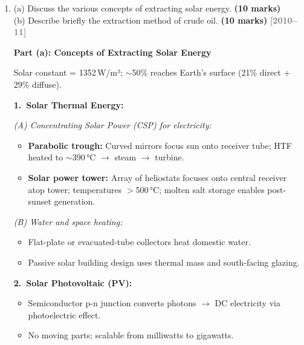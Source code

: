 \documentclass[12pt,a3paper]{article}
\newcommand{\yr}[1]{\hfill\textcolor{gray}{\small\textbf{[#1]}}}
\newcommand{\mk}[1]{\textcolor{orange!70!black}{\small\textbf{(#1 marks)}}}
\begin{document}
\begin{enumerate}
\begin{tcolorbox}[enhanced,breakable,ansbox,colback=cA!4,colframe=cA,
  boxrule=0.8pt,arc=5pt,
  title={\textbf{Answer}},fonttitle=\bfseries\color{white},colbacktitle=cA]
\[
  \underbrace{\text{CO}_2 + \text{H}_2\text{O} \xrightarrow{\text{sunlight}} \text{Biomass} + \text{O}_2}_{\text{photosynthesis (growth)}}
  \qquad
  \underbrace{\text{Biomass} + \text{O}_2 \to \text{CO}_2 + \text{H}_2\text{O} + \text{Heat}}_{\text{combustion (energy release)}}
\]

The cycle is closed — unlike fossil fuels where carbon was locked away for millions of years.

\end{tcolorbox}

\item \label{qlabel:A1-Q10}
(a) Discuss the various concepts of extracting solar energy. \mk{10}\\
(b) Describe briefly the extraction method of crude oil. \mk{10}
\yr{2010--11}

\begin{tcolorbox}[enhanced,breakable,ansbox,colback=cA!4,colframe=cA,
  boxrule=0.8pt,arc=5pt,
  title={\textbf{Answer}},fonttitle=\bfseries\color{white},colbacktitle=cA]

\textbf{Part (a): Concepts of Extracting Solar Energy}

Solar constant = 1352\,W/m²; $\sim$50\% reaches Earth's surface (21\% direct + 29\% diffuse).

\textbf{1.\ Solar Thermal Energy:}

\textit{(A) Concentrating Solar Power (CSP) for electricity:}
\begin{itemize}[leftmargin=1.5em,itemsep=1pt]
  \item \textbf{Parabolic trough:} Curved mirrors focus sun onto receiver tube; HTF heated to $\sim$390\,°C $\to$ steam $\to$ turbine.
  \item \textbf{Solar power tower:} Array of heliostats focuses onto central receiver atop tower; temperatures $>$500\,°C; molten salt storage enables post-sunset generation.
\end{itemize}

\textit{(B) Water and space heating:}
\begin{itemize}[leftmargin=1.5em,itemsep=1pt]
  \item Flat-plate or evacuated-tube collectors heat domestic water.
  \item Passive solar building design uses thermal mass and south-facing glazing.
\end{itemize}

\textbf{2.\ Solar Photovoltaic (PV):}
\begin{itemize}[leftmargin=1.5em,itemsep=1pt]
  \item Semiconductor p-n junction converts photons $\to$ DC electricity via photoelectric effect.
  \item No moving parts; scalable from milliwatts to gigawatts.
\end{itemize}


\end{tcolorbox}
\end{enumerate}
\end{document}
